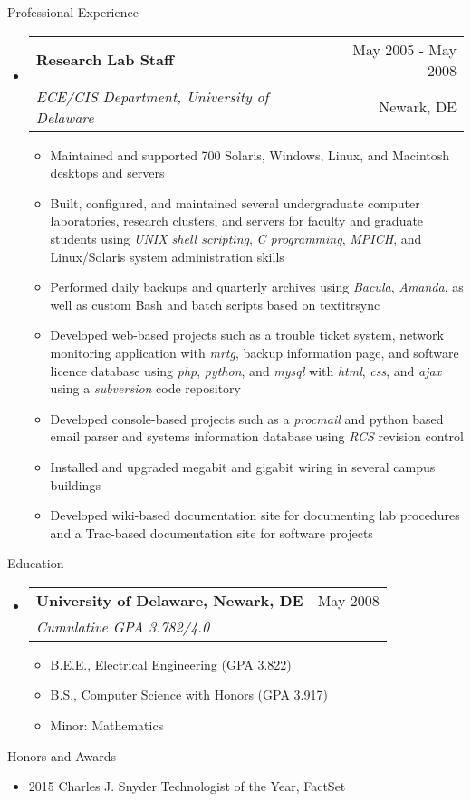 \documentclass[letterpaper,10pt]{article}
\makeatletter
\newenvironment{ressection}[1]{
	\vspace{4pt}
	{\fontfamily{phv}\selectfont\Large#1}
	\begin{itemize}
	\vspace{3pt}
}{
	\end{itemize}
}
\newcommand{\resitem}[1]{
	\vspace{-4pt}
	\item \begin{flushleft} #1 \end{flushleft}
}
\newcommand{\ressubitem}[1]{
	\vspace{-1pt}
	\item \begin{flushleft} #1 \end{flushleft}
}
\newcommand{\resbigitem}[4]{
	\vspace{-5pt}
	\item
	\begin{tabular*}{6in}{l@{\extracolsep{\fill}}r}
		\textbf{#1} & #2 \\
		\textit{#3} & #4\\
	\end{tabular*}
}
\newenvironment{ressubsec}[4]{
	\resbigitem{#1}{#2}{#3}{#4}
	\vspace{-2pt}
	\begin{itemize}
}{
	\end{itemize}
}
\makeatother
\begin{document}
\begin{ressection}{Professional Experience}
\pagebreak

	\begin{ressubsec}{Research Lab Staff}{May 2005 - May 2008}{ECE/CIS Department, University of Delaware}{Newark, DE}
		\ressubitem{Maintained and supported 700 Solaris, Windows, Linux, and Macintosh desktops and servers}
		\ressubitem{Built, configured, and maintained several undergraduate computer laboratories, research clusters, and servers for faculty and graduate students using \textit{UNIX shell scripting}, \textit{C programming}, \textit{MPICH}, and Linux/Solaris system administration skills}
		\ressubitem{Performed daily backups and quarterly archives using \textit{Bacula}, \textit{Amanda}, as well as custom Bash and batch scripts based on textit{rsync}}
		\ressubitem{Developed web-based projects such as a trouble ticket system, network monitoring application with \textit{mrtg}, backup information page, and software licence database using \textit{php}, \textit{python}, and \textit{mysql} with \textit{html}, \textit{css}, and \textit{ajax} using a \textit{subversion} code repository}
		\ressubitem{Developed console-based projects such as a \textit{procmail} and python based email parser and systems information database using \textit{RCS} revision control}
		\ressubitem{Installed and upgraded megabit and gigabit wiring in several campus buildings}
		\ressubitem{Developed wiki-based documentation site for documenting lab procedures and a Trac-based documentation site for software projects}
	\end{ressubsec}
\end{ressection}

\begin{ressection}{Education}
	\begin{ressubsec}{University of Delaware, Newark, DE}{May 2008}{Cumulative GPA 3.782/4.0}{}
		\ressubitem{B.E.E., Electrical Engineering (GPA 3.822)}
		\ressubitem{B.S., Computer Science with Honors (GPA 3.917)}
		\ressubitem{Minor: Mathematics}
	\end{ressubsec}
\end{ressection}

\begin{ressection}{Honors and Awards}
	\resitem{2015 Charles J. Snyder Technologist of the Year, FactSet}
\end{ressection}
\end{document}
